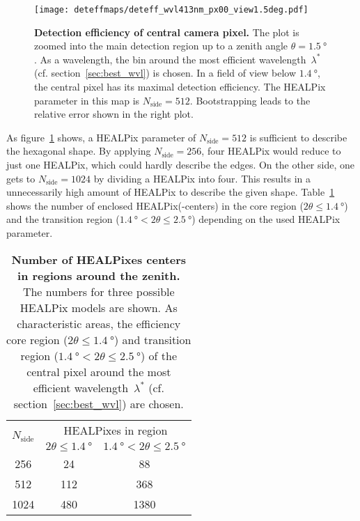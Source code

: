 \begin{figure}[H]
	\centering
	\texttt{[image: deteffmaps/deteff\_wvl413nm\_px00\_view1.5deg.pdf]}
	\caption[Detection efficiency of central camera pixel]{\textbf{Detection efficiency of central camera pixel.} The plot is zoomed into the main detection region up to a zenith angle $\theta=\SI{1.5}{\degree}$. As a wavelength, the bin around the most efficient wavelength~$\lambda^\ast$ (cf. section~\ref{sec:best_wvl}) is chosen. In a field of view below $\SI{1.4}{\degree}$, the central pixel has its maximal detection efficiency. The HEALPix parameter in this map is $N_\text{side}=\num{512}$. Bootstrapping leads to the relative error shown in the right plot.}
	\label{deteffmap:px0}
\end{figure}

As figure~\ref{deteffmap:px0} shows, a HEALPix parameter of $N_\text{side}=\num{512}$ is sufficient to describe the hexagonal shape. By applying $N_\text{side}=\num{256}$, four HEALPix would reduce to just one HEALPix, which could hardly describe the edges. On the other side, one gets to $N_\text{side}=\num{1024}$ by dividing a HEALPix into four. This results in a unnecessarily high amount of HEALPix to describe the given shape. Table~\ref{n_healpix_fov} shows the number of enclosed HEALPix(-centers) in the core region ($2\theta\leq\SI{1.4}{\degree}$) and the transition region ($\SI{1.4}{\degree} < 2\theta \leq \SI{2.5}{\degree}$) depending on the used HEALPix parameter.

\begin{table}[H]
	\centering
	\begin{tabular}{c|c|c}
		\toprule
		\multirow{2}{*}{$N_\text{side}$} & \multicolumn{2}{c}{HEALPixes in region} \\
		&	$2\theta\leq\SI{1.4}{\degree}$ & $\SI{1.4}{\degree} < 2\theta \leq \SI{2.5}{\degree}$ \\
		\midrule
		\num{256}  & \num{24}  & \num{88} \\
		\num{512}  & \num{112} & \num{368} \\
		\num{1024} & \num{480} & \num{1380} \\
		\bottomrule
	\end{tabular}
	\caption[Number of HEALPixes centers in regions around the zenith]{\textbf{Number of HEALPixes centers in regions around the zenith.} The numbers for three possible HEALPix models are shown. As characteristic areas, the efficiency core region ($2\theta\leq\SI{1.4}{\degree}$) and transition region ($\SI{1.4}{\degree} < 2\theta \leq \SI{2.5}{\degree}$) of the central pixel around the most efficient wavelength~$\lambda^\ast$ (cf. section~\ref{sec:best_wvl}) are chosen.}
	\label{n_healpix_fov}
\end{table}

